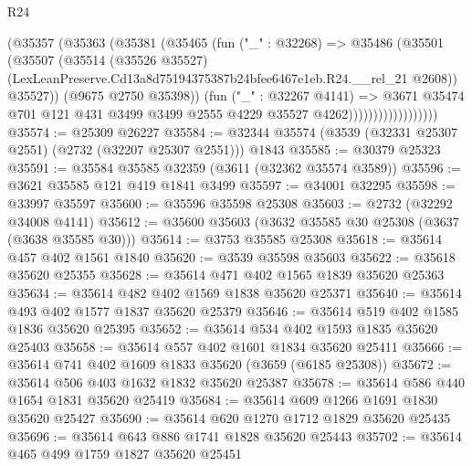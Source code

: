 \begin{lexlean}{R24}
\begin{coremodule}
                              (@35357
                                (@35363
                                  (@35381
                                    (@35465
                                      (fun ("_" : @32268) =>
                                      @35486
                                        (@35501
                                          (@35507
                                            (@35514
                                              (@35526 @35527)
                                              (LexLeanPreserve.Cd13a8d75194375387b24bfee6467e1eb.R24.__rel_21
                                                @2608))
                                            @35527))
                                        (@9675 @2750 @35398))
                                      (fun ("_" : @32267 @4141) =>
                                      @3671
                                        @35474
                                        @701
                                        @121
                                        @431
                                        @3499
                                        @3499
                                        @2555
                                        @4229
                                        @35527
                                        @4262))))))))))))))))))
@35574 := @25309 @26227
@35584 := @32344 @35574 (@3539 (@32331 @25307 @2551) (@2732 (@32207 @25307 @2551))) @1843
@35585 := @30379 @25323
@35591 := @35584 @35585 @32359 (@3611 (@32362 @35574 @3589))
@35596 := @3621 @35585 @121 @419 @1841 @3499
@35597 := @34001 @32295
@35598 := @33997 @35597
@35600 := @35596 @35598 @25308
@35603 := @2732 (@32292 @34008 @4141)
@35612 := @35600 @35603 (@3632 @35585 @30 @25308 (@3637 (@3638 @35585 @30)))
@35614 := @3753 @35585 @25308
@35618 := @35614 @457 @402 @1561 @1840
@35620 := @3539 @35598 @35603
@35622 := @35618 @35620 @25355
@35628 := @35614 @471 @402 @1565 @1839 @35620 @25363
@35634 := @35614 @482 @402 @1569 @1838 @35620 @25371
@35640 := @35614 @493 @402 @1577 @1837 @35620 @25379
@35646 := @35614 @519 @402 @1585 @1836 @35620 @25395
@35652 := @35614 @534 @402 @1593 @1835 @35620 @25403
@35658 := @35614 @557 @402 @1601 @1834 @35620 @25411
@35666 := @35614 @741 @402 @1609 @1833 @35620 (@3659 (@6185 @25308))
@35672 := @35614 @506 @403 @1632 @1832 @35620 @25387
@35678 := @35614 @586 @440 @1654 @1831 @35620 @25419
@35684 := @35614 @609 @1266 @1691 @1830 @35620 @25427
@35690 := @35614 @620 @1270 @1712 @1829 @35620 @25435
@35696 := @35614 @643 @886 @1741 @1828 @35620 @25443
@35702 := @35614 @465 @499 @1759 @1827 @35620 @25451

\end{coremodule}
\end{lexlean}
